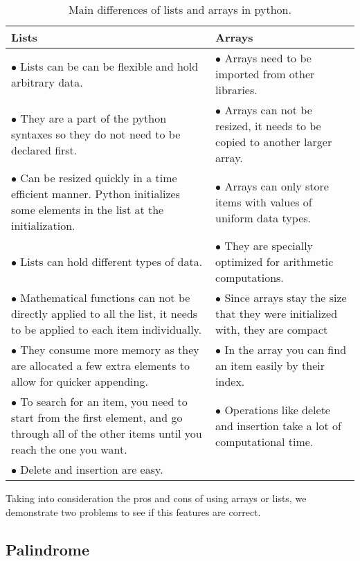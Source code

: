 \documentclass{article}
\begin{document}
\begin{table}
\caption{Main differences of lists and arrays in python.}	
\begin{tabular}{|p{55mm}|p{55mm}| }

\hline
\textbf{Lists} & \textbf{Arrays} \\
\hline
$\bullet$ Lists can be can be flexible and hold arbitrary data. & $\bullet$ Arrays need to be imported from other libraries.\\
$\bullet$ They are a part of the python syntaxes so they do not need to be declared first. & $\bullet$ Arrays can not be resized, it needs to be copied to another larger array.\\
$\bullet$ Can be resized quickly in a time efficient manner. Python initializes some elements in the list at the initialization. & $\bullet$ Arrays can only store items with values of uniform data types.\\
$\bullet$ Lists can hold different types of data. & $\bullet$ They are specially optimized for arithmetic computations.\\
$\bullet$ Mathematical functions can not be directly applied to all the list, it needs to be applied to each item individually. & $\bullet$ Since arrays stay the size that they were initialized with, they are compact\\
$\bullet$ They consume more memory as they are allocated a few extra elements to allow for quicker appending.& $\bullet$ In the array you can find an item easily by their index.\\
$\bullet$ To search for an item, you need to start from the first element, and go through all of the other items until you reach the one you want. & $\bullet$ Operations like delete and insertion take a lot of computational time.\\
$\bullet$ Delete and insertion are easy. & \\
\hline

\hline
\end{tabular}
\label{las}
\end{table}

Taking into consideration the pros and cons of using arrays or lists, we demonstrate two problems to see if this features are correct.\\

\subsection{Palindrome}
\end{document}
